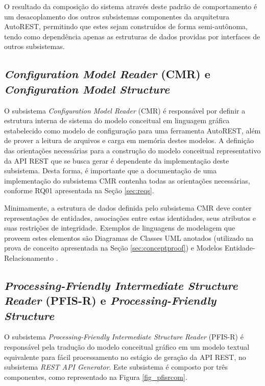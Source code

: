 O resultado da composição do sistema através deste padrão de comportamento é um desacoplamento dos outros subsistemas componentes da arquitetura AutoREST, permitindo que estes sejam construídos de forma semi-autônoma, tendo como dependência apenas as estruturas de dados providas por interfaces de outros subsistemas.


\subsection{\textit{Configuration Model Reader} (CMR) e \textit{Configuration Model Structure}}

O subsistema \textit{Configuration Model Reader} (CMR) é responsável por definir a estrutura interna de sistema do modelo conceitual em linguagem gráfica estabelecido como modelo de configuração para uma ferramenta AutoREST, além de prover a leitura de arquivos e carga em memória destes modelos. A definição das orientações necessárias para a construção do modelo conceitual representativo da API REST que se busca gerar é dependente da implementação deste subsistema. Desta forma, é importante que a documentação de uma implementação do subsistema CMR contenha todas as orientações necessárias, conforme RQ01 apresentada na Seção \ref{sec:reqs}.

Minimamente, a estrutura de dados definida pelo subsistema CMR deve conter representações de entidades, associações entre estas identidades, seus atributos e suas restrições de integridade. Exemplos de linguagens de modelagem que proveem estes elementos são Diagramas de Classes UML anotados (utilizado na prova de conceito apresentada na Seção \ref{sec:conceptproof}) e Modelos Entidade-Relacionamento \cite{POLAK:2015} \cite{VALVERDE:2009}.


\subsection{\textit{Processing-Friendly Intermediate Structure Reader} (PFIS-R) e \textit{Processing-Friendly Structure}}

O subsistema \textit{Processing-Friendly Intermediate Structure Reader} (PFIS-R) é responsável pela tradução do modelo conceitual gráfico em um modelo textual equivalente para fácil processamento no estágio de geração da API REST, no subsistema \textit{REST API Generator}. Este subsistema é composto por três componentes, como representado na Figura \ref{fig_pfisrcom}.

